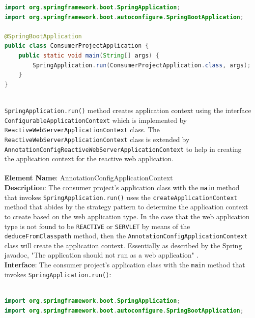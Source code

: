 {\begin{lstlisting}[language=Java, caption=Creating application context for reactive web application, label=AnnotationConfigReactiveWebServerApplicationContext]
import org.springframework.boot.SpringApplication;
import org.springframework.boot.autoconfigure.SpringBootApplication;

@SpringBootApplication
public class ConsumerProjectApplication {
    public static void main(String[] args) {
        SpringApplication.run(ConsumerProjectApplication.class, args);
    }
}
\end{lstlisting}\ \\

\texttt{SpringApplication.run()} method creates application context using the interface \texttt{ConfigurableApplicationContext} which is implemented by  \texttt{ReactiveWebServerApplicationContext} class. The \texttt{ReactiveWebServerApplicationContext} class is extended by \texttt{AnnotationConfigReactiveWebServerApplicationContext} to help in creating the application context for the reactive web application.\\

\noindent\makebox[\linewidth]{\rule{\textwidth}{3pt}}\ \\

\textbf{Element Name}: AnnotationConfigApplicationContext\\
\textbf{Description}: The consumer project's application class with the \texttt{main} method that invokes \texttt{SpringApplication.run()} uses the \texttt{createApplicationContext} method that abides by the strategy pattern to determine the application context to create based on the web application type. In the case that the web application type is not found to be \texttt{REACTIVE} or \texttt{SERVLET} by means of the \texttt{deduceFromClasspath} method, then the \texttt{AnnotationConfigApplicationContext} class will create the application context. Essentially as described by the Spring javadoc, "The application should not run as a web application" \cite{springjavadoc:onlineAnnotationConfigApplicationContext}.\\
\textbf{Interface}: The consumer project's application class with the \texttt{main} method that invokes \texttt{SpringApplication.run()}:\\

\clearpage

\begin{lstlisting}[language=Java, caption=Creating application context for non-web application, label=AnnotationConfigApplicationContext]

import org.springframework.boot.SpringApplication;
import org.springframework.boot.autoconfigure.SpringBootApplication;


\end{lstlisting}}
